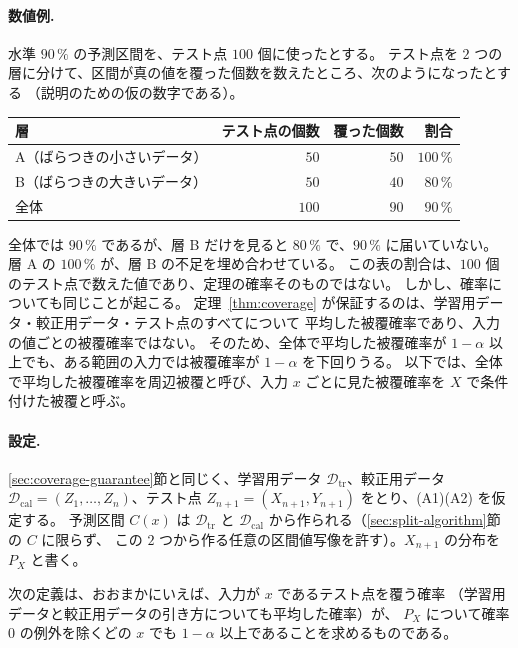 \documentclass[a4paper,11pt]{jsarticle}
\theoremstyle{definition}
\theoremstyle{plain}
\theoremstyle{remark}
\newcommand{\Dtr}{\mathcal{D}_{\mathrm{tr}}}     %
\newcommand{\Dcal}{\mathcal{D}_{\mathrm{cal}}}   %
\begin{document}
\paragraph{数値例.}
水準 $90\,\%$ の予測区間を、テスト点 $100$ 個に使ったとする。
テスト点を $2$ つの層に分けて、区間が真の値を覆った個数を数えたところ、次のようになったとする
（説明のための仮の数字である）。
\begin{center}
  \begin{tabular}{lrrr}
    \toprule
    層 & テスト点の個数 & 覆った個数 & 割合 \\
    \midrule
    A（ばらつきの小さいデータ） & $50$ & $50$ & $100\,\%$ \\
    B（ばらつきの大きいデータ） & $50$ & $40$ & $80\,\%$ \\
    全体 & $100$ & $90$ & $90\,\%$ \\
    \bottomrule
  \end{tabular}
\end{center}
全体では $90\,\%$ であるが、層 B だけを見ると $80\,\%$ で、$90\,\%$ に届いていない。
層 A の $100\,\%$ が、層 B の不足を埋め合わせている。
この表の割合は、$100$ 個のテスト点で数えた値であり、定理の確率そのものではない。
しかし、確率についても同じことが起こる。
定理~\ref{thm:coverage} が保証するのは、学習用データ・較正用データ・テスト点のすべてについて
平均した被覆確率であり、入力の値ごとの被覆確率ではない。
そのため、全体で平均した被覆確率が $1-\alpha$ 以上でも、ある範囲の入力では被覆確率が
$1-\alpha$ を下回りうる。
以下では、全体で平均した被覆確率を周辺被覆と呼び、入力 $x$ ごとに見た被覆確率を
$X$ で条件付けた被覆と呼ぶ。

\paragraph{設定.}
\ref{sec:coverage-guarantee}節と同じく、学習用データ $\Dtr$、較正用データ
$\Dcal=(Z_1,\dots,Z_n)$、テスト点 $Z_{n+1}=(X_{n+1},Y_{n+1})$ をとり、(A1)(A2) を仮定する。
予測区間 $C(x)$ は $\Dtr$ と $\Dcal$ から作られる（\ref{sec:split-algorithm}節の $C$ に限らず、
この $2$ つから作る任意の区間値写像を許す）。$X_{n+1}$ の分布を $P_X$ と書く。

次の定義は、おおまかにいえば、入力が $x$ であるテスト点を覆う確率
（学習用データと較正用データの引き方についても平均した確率）が、
$P_X$ について確率 $0$ の例外を除くどの $x$ でも $1-\alpha$ 以上であることを求めるものである。
\end{document}
